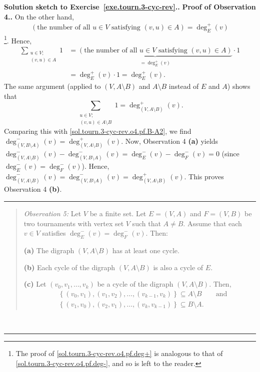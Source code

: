 \documentclass[numbers=enddot,12pt,final,onecolumn,notitlepage]{scrartcl}%
\theoremstyle{definition}
\newenvironment{statement}{\begin{quote}}{\end{quote}}
\newenvironment{proof}[1][Proof]{\noindent\textbf{#1.} }{\ \rule{0.5em}{0.5em}}
\let\sumnonlimits\sum
\renewcommand{\sum}{\sumnonlimits\limits}
\newcommand{\set}[1]{\left\{ #1 \right\}}
\newcommand{\tup}[1]{\left( #1 \right)}
\newcommand{\underbrack}[2]{\underbrace{#1}_{\substack{#2}}}
\begin{document}
\begin{proof}[Solution sketch to Exercise~\ref{exe.tourn.3-cyc-rev}.]
\begin{proof}[Proof of Observation 4.]
On the other hand,
\begin{align}
\tup{\text{the number of all } u \in V \text{ satisfying }
      \tup{v, u} \in A}
 = \deg^+_E \tup{v}
\label{sol.tourn.3-cyc-rev.o4.pf.deg+}
\end{align}
\footnote{The proof of
\eqref{sol.tourn.3-cyc-rev.o4.pf.deg+} is analogous to that of
\eqref{sol.tourn.3-cyc-rev.o4.pf.deg-}, and so is left to the
reader.}. Hence,
\begin{align}
\sum_{\substack{u \in V;\\ \tup{v, u} \in A}} 1
&= \underbrack{\tup{\text{the number of all } u \in V \text{ satisfying }
                \tup{v, u} \in A}}{= \deg^+_E \tup{v}} \cdot 1
\nonumber \\
&= \deg^+_E \tup{v} \cdot 1
= \deg^+_E \tup{v} .
\end{align}
The same argument (applied to $\tup{V, A \setminus B}$ and
$A \setminus B$ instead of $E$ and $A$) shows
that
\[
\sum_{\substack{u \in V;\\ \tup{v, u} \in A \setminus B}} 1
= \deg^+_{\tup{V, A \setminus B}} \tup{v} .
\]
Comparing this with \eqref{sol.tourn.3-cyc-rev.o4.pf.B-A2}, we find
$\deg^-_{\tup{V, B\setminus A}} \tup{v}
= \deg^+_{\tup{V, A \setminus B}} \tup{v}$. Now,
Observation 4 \textbf{(a)} yields
$\deg^-_{\tup{V, A\setminus B}} \tup{v}
- \deg^-_{\tup{V, B\setminus A}} \tup{v}
= \deg^-_E \tup{v} - \deg^-_F \tup{v} = 0$ (since
$\deg^-_E \tup{v} = \deg^-_F \tup{v}$). Hence,
$\deg^-_{\tup{V, A\setminus B}} \tup{v}
= \deg^-_{\tup{V, B\setminus A}} \tup{v}
= \deg^+_{\tup{V, A \setminus B}} \tup{v}$.
This proves Observation 4 \textbf{(b)}.
\end{proof}

\begin{statement}
\textit{Observation 5:} Let $V$ be a finite set. Let
$E = \tup{V, A}$ and $F = \tup{V, B}$ be
two tournaments with vertex set $V$ such that $A \neq B$.
Assume that each
$v \in V$ satisfies $\deg^-_E \tup{v} = \deg^-_F \tup{v}$.
Then:

\textbf{(a)} The digraph $\tup{V, A \setminus B}$ has at least one
cycle.

\textbf{(b)} Each cycle of the digraph $\tup{V, A \setminus B}$
is also a cycle of $E$.

\textbf{(c)} Let $\tup{v_0, v_1, \ldots, v_k}$ be a cycle of the
digraph $\tup{V, A \setminus B}$. Then,
\begin{align*}
& \set{\tup{v_0, v_1}, \tup{v_1, v_2}, \ldots,
       \tup{v_{k-1}, v_k}} \subseteq A \setminus B
\qquad \text{and} \\
& \set{\tup{v_1, v_0}, \tup{v_2, v_1}, \ldots,
       \tup{v_k, v_{k-1}}} \subseteq B \setminus A .
\end{align*}
\end{statement}


\end{proof}
\end{document}
